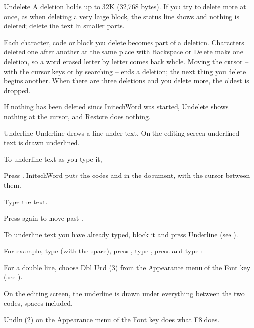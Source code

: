 \begin{Feature}{Undelete}
A deletion holds up to 32K (32,768 bytes).  If you try to delete more at
once, as when deleting a very large block, the status line shows
 and nothing is deleted; delete the text in
smaller parts.

Each character, code or block you delete becomes part of a deletion.
Characters deleted one after another at the same place with Backspace or
Delete make one deletion, so a word erased letter by letter comes back
whole.  Moving the cursor -- with the cursor keys or by searching -- ends a
deletion; the next thing you delete begins another.  When there are three
deletions and you delete more, the oldest is dropped.

If nothing has been deleted since InitechWord was started, Undelete shows
nothing at the cursor, and Restore does nothing.

\end{Feature}

\begin{Feature}{Underline}
Underline draws a line under text.  On the editing screen underlined text is
drawn underlined.

To underline text as you type it,
\begin{WPSteps}
\item Press .  InitechWord puts the codes \Code{[UND]} and
\Code{[und]} in the document, with the cursor between them.
\item Type the text.
\item Press  again to move past \Code{[und]}.
\end{WPSteps}
\begin{WPNote}To underline text you have already typed, block it and press
Underline (see ).\end{WPNote}

For example, type  (with the space), press
, type , press 
and type :
\EndReplay

\Notes
{}
For a double line, choose Dbl Und (3) from the Appearance menu of the Font
key (see ).

On the editing screen, the underline is drawn under everything between the
two codes, spaces included.

Undln (2) on the Appearance menu of the Font key does what F8 does.

\end{Feature}

